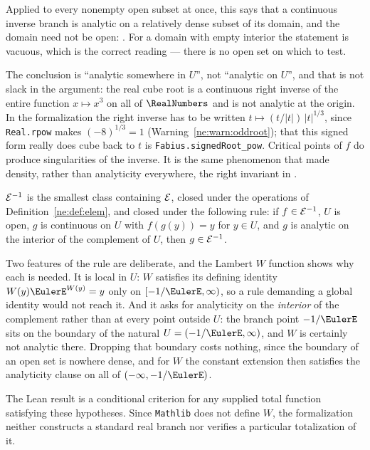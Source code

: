 Applied to every nonempty open subset at once, this says that a continuous
inverse branch is analytic on a relatively dense subset of its domain, and the
domain need not be open:
.  For a
domain with empty interior the statement is vacuous, which is the correct
reading --- there is no open set on which to test.

The conclusion is ``analytic somewhere in $U$'', not ``analytic on $U$'', and
that is not slack in the argument: the real cube root is a continuous right
inverse of the entire function $x\mapsto x^3$ on all of $\RealNumbers$ and is not
analytic at the origin.  In the formalization the right inverse has to be
written $t\mapsto(t/|t|)\,|t|^{1/3}$, since \texttt{Real.rpow} makes
$(-8)^{1/3}=1$ (Warning~\ref{ne:warn:oddroot}); that this signed form really does
cube back to $t$ is \texttt{Fabius.signedRoot\_pow}.  Critical points of $f$
do produce singularities of the inverse.  It is the same phenomenon that made
density, rather than analyticity everywhere, the right invariant in
.

\begin{definition}\label{ne:def:elemplus}
$\mathcal E^{-1}$ is the smallest class containing $\mathcal E$, closed under the
operations of Definition~\ref{ne:def:elem}, and closed under the following rule: if
$f\in\mathcal E^{-1}$, $U$ is open, $g$ is continuous on $U$ with $f(g(y))=y$ for
$y\in U$, and $g$ is analytic on the interior of the complement of $U$, then
$g\in\mathcal E^{-1}$.
\end{definition}

Two features of the rule are deliberate, and the Lambert $W$ function shows
why each is needed.  It is local in $U$: $W$ satisfies its defining identity
$W(y)\EulerE^{W(y)}=y$ only on $[-1/\EulerE,\infty)$, so a rule demanding a global
identity would not reach it.  And it asks for analyticity on the
\emph{interior} of the complement rather than at every point outside $U$: the
branch point $-1/\EulerE$ sits on the boundary of the natural $U=(-1/\EulerE,\infty)$,
and $W$ is certainly not analytic there.  Dropping that boundary costs
nothing, since the boundary of an open set is nowhere dense, and for $W$ the
constant extension then satisfies the analyticity clause on all of
$(-\infty,-1/\EulerE)$.

The Lean result is a conditional criterion for any supplied total function
satisfying these hypotheses.  Since \texttt{Mathlib} does not define $W$, the
formalization neither constructs a standard real branch nor verifies a
particular totalization of it.

